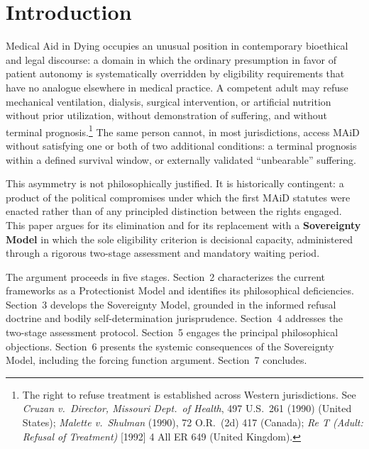 \documentclass[11pt, letterpaper]{article}
\begin{document}
\bigskip

\section{Introduction}

Medical Aid in Dying occupies an unusual position in contemporary bioethical and legal
discourse: a domain in which the ordinary presumption in favor of patient autonomy is
systematically overridden by eligibility requirements that have no analogue elsewhere in
medical practice. A competent adult may refuse mechanical ventilation, dialysis, surgical
intervention, or artificial nutrition without prior utilization, without demonstration of
suffering, and without terminal prognosis.\footnote{%
  The right to refuse treatment is established across Western jurisdictions. See
  \textit{Cruzan v.\ Director, Missouri Dept.\ of Health}, 497 U.S.\ 261 (1990)
  (United States); \textit{Malette v.\ Shulman} (1990), 72 O.R.\ (2d) 417 (Canada);
  \textit{Re T (Adult: Refusal of Treatment)} [1992] 4 All ER 649 (United Kingdom).}
The same person cannot, in most jurisdictions, access MAiD without satisfying one or both
of two additional conditions: a terminal prognosis within a defined survival window, or
externally validated ``unbearable'' suffering.

This asymmetry is not philosophically justified. It is historically contingent: a product
of the political compromises under which the first MAiD statutes were enacted rather than
of any principled distinction between the rights engaged. This paper argues for its
elimination and for its replacement with a \textbf{Sovereignty Model} in which the sole
eligibility criterion is decisional capacity, administered through a rigorous two-stage
assessment and mandatory waiting period.

The argument proceeds in five stages. Section~2 characterizes the current frameworks as
a Protectionist Model and identifies its philosophical deficiencies. Section~3 develops
the Sovereignty Model, grounded in the informed refusal doctrine and bodily
self-determination jurisprudence. Section~4 addresses the two-stage assessment protocol.
Section~5 engages the principal philosophical objections. Section~6 presents the systemic
consequences of the Sovereignty Model, including the forcing function argument.
Section~7 concludes.

\end{document}
